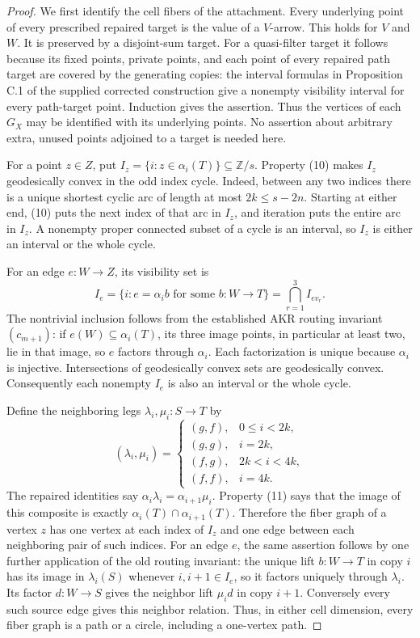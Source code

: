 \begin{proof}
We first identify the cell fibers of the attachment. Every underlying
point of every prescribed repaired target is the value of a $V$-arrow.
This holds for $V$ and $W$. It is preserved by a disjoint-sum target.
For a quasi-filter target it follows because its fixed points, private
points, and each point of every repaired path target are covered by
the generating copies: the interval formulas in
Proposition C.1 of the supplied corrected construction give a nonempty
visibility interval for every path-target point. Induction gives the
assertion. Thus the vertices of each $G_X$ may be identified with its
underlying points. No assertion about arbitrary extra, unused points
adjoined to a target is needed here.

For a point $z\in Z$, put
$I_z=\{i:z\in\alpha_i(T)\}\subseteq\mathbb Z/s$.
Property (10) makes $I_z$ geodesically convex in the odd index cycle.
Indeed, between any two indices there is a unique shortest cyclic arc
of length at most $2k\leq s-2n$. Starting at either end, (10) puts the
next index of that arc in $I_z$, and iteration puts the entire arc in
$I_z$. A nonempty proper connected subset of a cycle is an interval,
so $I_z$ is either an interval or the whole cycle.

For an edge $e:W\to Z$, its visibility set is
\[
 I_e=\{i:e=\alpha_i b\text{ for some }b:W\to T\}
     =\bigcap_{r=1}^{3}I_{ev_r}.
\]
The nontrivial inclusion follows from the established AKR routing
invariant $(c_{m+1})$: if $e(W)\subseteq\alpha_i(T)$, its three image
points, in particular at least two, lie in that image, so $e$ factors
through $\alpha_i$. Each factorization is unique because $\alpha_i$
is injective. Intersections of geodesically convex sets are
geodesically convex. Consequently each nonempty $I_e$ is also an
interval or the whole cycle.

Define the neighboring legs $\lambda_i,\mu_i:S\to T$ by
\[
 (\lambda_i,\mu_i)=
 \begin{cases}
 (g,f),&0\leq i<2k,\\
 (g,g),&i=2k,\\
 (f,g),&2k<i<4k,\\
 (f,f),&i=4k.
 \end{cases}
\]
The repaired identities say
$\alpha_i\lambda_i=\alpha_{i+1}\mu_i$.
Property (11) says that the image of this composite is exactly
$\alpha_i(T)\cap\alpha_{i+1}(T)$. Therefore the fiber graph of a
vertex $z$ has one vertex at each index of $I_z$ and one edge between
each neighboring pair of such indices. For an edge $e$, the same
assertion follows by one further application of the old routing
invariant: the unique lift $b:W\to T$ in copy $i$ has its image in
$\lambda_i(S)$ whenever $i,i+1\in I_e$, so it factors uniquely
through $\lambda_i$. Its factor $d:W\to S$ gives the neighbor lift
$\mu_i d$ in copy $i+1$. Conversely every such source edge gives this
neighbor relation. Thus, in either cell dimension, every fiber graph
is a path or a circle, including a one-vertex path.


\end{proof}
